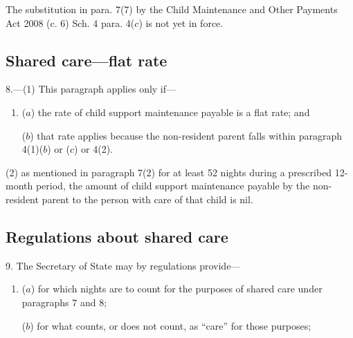 \documentclass[a4paper]{article}
\begin{document}
{{The substitution in para. 7(7) by the Child Maintenance and Other Payments Act 2008 (c. 6) Sch. 4 para. 4($c$) is not yet in force.
}

\subsection*{Shared care---flat rate}

8.—(1) This paragraph applies only if---
\begin{enumerate}\item[]
($a$) the rate of child support maintenance payable is a flat rate; and

($b$) that rate applies because the non-resident parent falls within paragraph
4(1)($b$) or ($c$) or 4(2).
\end{enumerate}

(2) 
 as mentioned in paragraph 7(2) for at least 52 nights during a prescribed 12-month period, the amount of child support maintenance payable by the non-resident parent to the person with care of that child is nil.


\subsection*{Regulations about shared care}

9. The Secretary of State may by regulations provide---
\begin{enumerate}\item[]

($a$) for which nights are to count for the purposes of shared care under
paragraphs 7 and 8;

($b$) for what counts, or does not count, as “care” for those purposes; 



\end{enumerate}}
\end{document}
